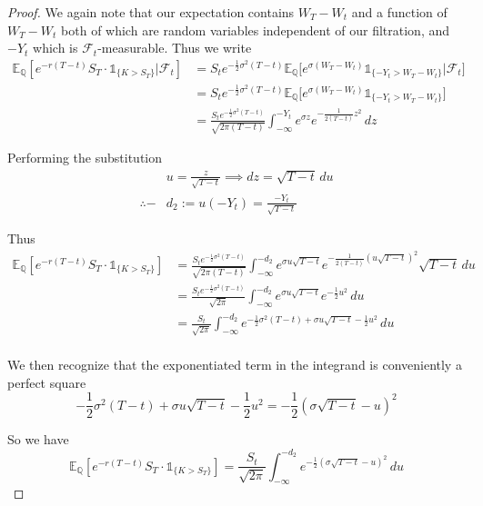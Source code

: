 \documentclass[12pt]{article}
\newlength\tindent
\renewcommand{\indent}{\hspace*{\tindent}}
\begin{document}
\begin{proof}
\indent We again note that our expectation contains $W_T - W_t$ and a function of $W_T - W_t$ both of which are random variables independent of our filtration, and $-Y_t$ which is $\mathcal F_t$-measurable. Thus we write
\begin{align*}
	\mathbb E_{\mathbb Q}[ e^{-r(T - t)} S_T \cdot \mathds 1_{\{K > S_T\}}| \mathcal F_t] &= 
S_te^{-\frac{1}{2}\sigma^2(T - t)} \mathbb E_{\mathbb Q}\bigg[e^{\sigma(W_T - W_t)}\mathds 1_{\{-Y_t > W_T - W_t\}} \bigg| \mathcal F_t \bigg]  \\
	&= S_te^{-\frac{1}{2}\sigma^2(T - t)} \mathbb E_{\mathbb Q}\bigg[e^{\sigma(W_T - W_t)}\mathds 1_{\{-Y_t > W_T - W_t\}}\bigg] \\	
	 &= \frac{S_te^{-\frac{1}{2}\sigma^2(T - t)}}{\sqrt{2\pi(T - t)}} \int^{-Y_t}_{-\infty} e^{\sigma z} e^{-\frac{1}{2(T - t)} z^2}\,dz
\end{align*}

Performing the substitution
\begin{align*}
	&u = \frac{z}{\sqrt{T - t}} \implies dz = \sqrt{T - t}\,du \\
	\therefore -&d_2 := u(-Y_t) = \frac{-Y_t}{\sqrt{T - t}}
\end{align*}

Thus
\begin{align*}
	\mathbb E_{\mathbb Q}[ e^{-r(T - t)} S_T \cdot \mathds 1_{\{K > S_T\}}] &= \frac{S_te^{-\frac{1}{2}\sigma^2(T - t)}}{\sqrt{2\pi(T - t)}} \int^{-d_2}_{-\infty} e^{\sigma u\sqrt{T - t}} e^{-\frac{1}{2(T - t)}(u\sqrt{T - t})^2}\sqrt{T - t}\,du \\ 
	&= \frac{S_te^{-\frac{1}{2}\sigma^2(T - t)}}{\sqrt{2\pi}} \int^{-d_2}_{-\infty} e^{\sigma u\sqrt{T - t}} e^{-\frac{1}{2}u^2}\,du \\ 
	&= \frac{S_t}{\sqrt{2\pi}} \int^{-d_2}_{-\infty} e^{-\frac{1}{2}\sigma^2(T - t) + \sigma u\sqrt{T - t} - \frac{1}{2}u^2}\,du \\ 
\end{align*}

\indent We then recognize that the exponentiated term in the integrand is conveniently a perfect square
\begin{equation*}
	-\frac{1}{2}\sigma^2(T - t) + \sigma u\sqrt{T - t} - \frac{1}{2}u^2 = -\frac{1}{2}(\sigma\sqrt{T - t} - u)^2
\end{equation*}

So we have
\begin{equation*}
	\mathbb E_{\mathbb Q}[ e^{-r(T - t)} S_T \cdot \mathds 1_{\{K > S_T\}}] = \frac{S_t}{\sqrt{2\pi}} \int^{-d_2}_{-\infty} e^{-\frac{1}{2}(\sigma\sqrt{T - t} - u)^2}\,du 
\end{equation*}


\end{proof}
\end{document}
